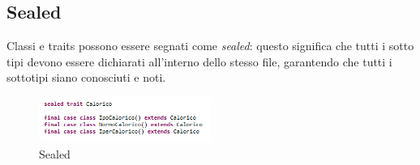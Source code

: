 \subsection{Sealed}
Classi e traits possono essere segnati come \textit{sealed}: questo significa che tutti i sotto tipi devono essere dichiarati all'interno dello stesso file, garantendo che tutti i sottotipi siano conosciuti e noti.
\begin{figure}[h]
	\centering
	\includegraphics[width=0.5\textwidth]{Immagini/Sealed.png}
	\caption{Sealed}
	\label{fig:sealed}
\end{figure}
